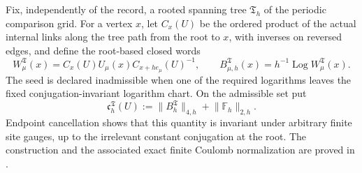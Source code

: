 \documentclass[11pt]{article}
\numberwithin{equation}{section}
\theoremstyle{definition}
\theoremstyle{remark}
\newcommand{\norm}[1]{\lVert#1\rVert}
\begin{document}
Fix, independently of the record, a rooted spanning tree $\mathfrak T_h$ of
the periodic comparison grid.  For a vertex $x$, let $C_x(U)$ be the ordered
product of the actual internal links along the tree path from the root to
$x$, with inverses on reversed edges, and define the root-based closed words
\begin{equation}
 W^{\mathfrak T}_\mu(x)
 =C_x(U)U_\mu(x)C_{x+h e_\mu}(U)^{-1},
 \qquad
 B^{\mathfrak T}_{\mu,h}(x)
 =h^{-1}\operatorname{Log}W^{\mathfrak T}_\mu(x).
 \label{eq:rooted-Wilson-seed}
\end{equation}
The seed is declared inadmissible when one of the required logarithms leaves
the fixed conjugation-invariant logarithm chart.  On the admissible set put
\begin{equation}
 \mathfrak c_h^{\mathfrak T}(U)
 :=\norm{B_h^{\mathfrak T}}_{4,h}+\norm{\mathbb F_h}_{2,h}.
 \label{eq:rooted-Wilson-certificate}
\end{equation}
Endpoint cancellation shows that this quantity is invariant under arbitrary
finite site gauges, up to the irrelevant constant conjugation at the root.
The construction and the associated exact finite Coulomb normalization are
proved in .
\end{document}
